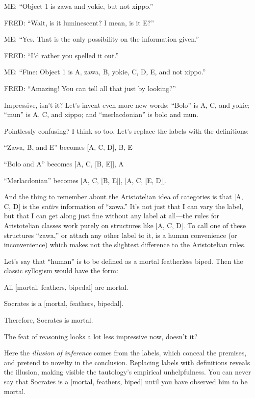 {
 ME: ``Object 1 is zawa and yokie, but not
xippo.''}

{
 FRED: ``Wait, is it luminescent? I mean, is it
E?''}

{
 ME: ``Yes. That is the only possibility on the
information given.''}

{
 FRED: ``I'd rather you spelled it
out.''}

{
 ME: ``Fine: Object 1 is A, zawa, B, yokie, C, D,
E, and not xippo.''}

{
 FRED: ``Amazing! You can tell all that just by
looking?''}

{
 Impressive, isn't it? Let's invent
even more new words: ``Bolo'' is A,
C, and yokie; ``mun'' is A, C, and
xippo; and ``merlacdonian'' is bolo
and mun.}

{
 Pointlessly confusing? I think so too. Let's
replace the labels with the definitions:}

{
 ``Zawa, B, and E'' becomes [A,
C, D], B, E}

{
 ``Bolo and A'' becomes [A, C,
[B, E]], A}

{
 ``Merlacdonian'' becomes [A, C,
[B, E]], [A, C, [E, {\textlnot}D]].}

{
 And the thing to remember about the Aristotelian idea of
categories is that [A, C, D] is the \textit{entire} information of
``zawa.'' It's not
just that I can vary the label, but that I can get along just fine
without any label at all---the rules for Aristotelian classes work
purely on structures like [A, C, D]. To call one of these structures
``zawa,'' or attach any other label
to it, is a human convenience (or inconvenience) which makes not the
slightest difference to the Aristotelian rules.}

{
 Let's say that
``human'' is to be defined as a
mortal featherless biped. Then the classic syllogism would have the
form:}

{
 All [mortal, {\textlnot}feathers, bipedal] are mortal.}

{
 Socrates is a [mortal, {\textlnot}feathers, bipedal].}

{
 Therefore, Socrates is mortal.}

{
 The feat of reasoning looks a lot less impressive now,
doesn't it?}

{
 Here the \textit{illusion of inference} comes from the labels,
which conceal the premises, and pretend to novelty in the conclusion.
Replacing labels with definitions reveals the illusion, making visible
the tautology's empirical unhelpfulness. You can never
say that Socrates is a [mortal, {\textlnot}feathers, biped] until you
have observed him to be mortal.}

